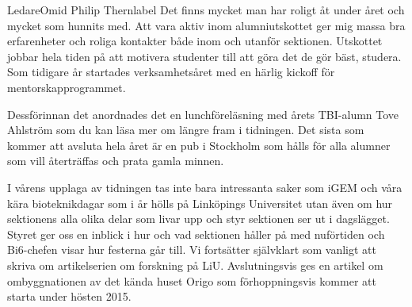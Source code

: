 
\begin{editorial}{3}{Ledare}{Omid Philip Thern}{label}
Det finns mycket man har
roligt åt under året och mycket som hunnits med. Att vara aktiv inom
alumniutskottet ger mig massa bra erfarenheter och roliga kontakter
både inom och utanför sektionen. Utskottet jobbar hela tiden på att
motivera studenter till att göra det de gör bäst, studera. Som
tidigare år startades verksamhetsåret med en härlig kickoff för
mentorskapprogrammet.

Dessförinnan det anordnades det en
lunchföreläsning med årets TBI-alumn Tove Ahlström som du kan läsa mer
om längre fram i tidningen. Det sista som kommer att avsluta hela året
är en pub i Stockholm som hålls för alla alumner som vill återträffas
och prata gamla minnen.


I vårens upplaga av tidningen tas inte bara intressanta saker som iGEM
och våra kära bioteknikdagar som i år hölls på Linköpings Universitet
utan även om hur sektionens alla olika delar som livar upp och styr
sektionen ser ut i dagslägget. Styret ger oss en inblick i hur och vad
sektionen håller på med nuförtiden och Bi6-chefen visar hur festerna
går till. Vi fortsätter självklart som vanligt att skriva om
artikelserien om forskning på LiU. Avslutningsvis ges en artikel om
ombyggnationen av det kända huset Origo som förhoppningsvis kommer att
starta under hösten 2015.
\end{editorial}
